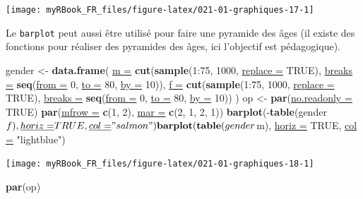 \documentclass[twoside,symmetric]{book}
\newenvironment{Shaded}{}{}
\newcommand{\DataTypeTok}[1]{\underline{#1}}
\newcommand{\DecValTok}[1]{#1}
\newcommand{\KeywordTok}[1]{\textbf{#1}}
\newcommand{\NormalTok}[1]{#1}
\newcommand{\OperatorTok}[1]{#1}
\newcommand{\OtherTok}[1]{#1}
\newcommand{\StringTok}[1]{#1}
\begin{document}
\texttt{[image: myRBook\_FR\_files/figure-latex/021-01-graphiques-17-1]}

Le \texttt{barplot} peut aussi être utilisé pour faire une pyramide des âges (il existe des fonctions pour réaliser des pyramides des âges, ici l'objectif est pédagogique).

\begin{Shaded}
\begin{Highlighting}[]
\NormalTok{gender <-}\StringTok{ }\KeywordTok{data.frame}\NormalTok{(}
  \DataTypeTok{m =} \KeywordTok{cut}\NormalTok{(}\KeywordTok{sample}\NormalTok{(}\DecValTok{1}\OperatorTok{:}\DecValTok{75}\NormalTok{, }\DecValTok{1000}\NormalTok{, }\DataTypeTok{replace =} \OtherTok{TRUE}\NormalTok{), }
    \DataTypeTok{breaks =} \KeywordTok{seq}\NormalTok{(}\DataTypeTok{from =} \DecValTok{0}\NormalTok{, }\DataTypeTok{to =} \DecValTok{80}\NormalTok{, }\DataTypeTok{by =} \DecValTok{10}\NormalTok{)), }
  \DataTypeTok{f =} \KeywordTok{cut}\NormalTok{(}\KeywordTok{sample}\NormalTok{(}\DecValTok{1}\OperatorTok{:}\DecValTok{75}\NormalTok{, }\DecValTok{1000}\NormalTok{, }\DataTypeTok{replace =} \OtherTok{TRUE}\NormalTok{), }
    \DataTypeTok{breaks =} \KeywordTok{seq}\NormalTok{(}\DataTypeTok{from =} \DecValTok{0}\NormalTok{, }\DataTypeTok{to =} \DecValTok{80}\NormalTok{, }\DataTypeTok{by =} \DecValTok{10}\NormalTok{))}
\NormalTok{)}
\NormalTok{op <-}\StringTok{ }\KeywordTok{par}\NormalTok{(}\DataTypeTok{no.readonly =} \OtherTok{TRUE}\NormalTok{)}
\KeywordTok{par}\NormalTok{(}\DataTypeTok{mfrow =} \KeywordTok{c}\NormalTok{(}\DecValTok{1}\NormalTok{, }\DecValTok{2}\NormalTok{), }\DataTypeTok{mar =} \KeywordTok{c}\NormalTok{(}\DecValTok{2}\NormalTok{, }\DecValTok{1}\NormalTok{, }\DecValTok{2}\NormalTok{, }\DecValTok{1}\NormalTok{))}
\KeywordTok{barplot}\NormalTok{(}\OperatorTok{-}\KeywordTok{table}\NormalTok{(gender}\OperatorTok{$}\NormalTok{f), }\DataTypeTok{horiz =} \OtherTok{TRUE}\NormalTok{, }\DataTypeTok{col =} \StringTok{"salmon"}\NormalTok{)}
\KeywordTok{barplot}\NormalTok{(}\KeywordTok{table}\NormalTok{(gender}\OperatorTok{$}\NormalTok{m), }\DataTypeTok{horiz =} \OtherTok{TRUE}\NormalTok{, }\DataTypeTok{col =} \StringTok{"lightblue"}\NormalTok{)}
\end{Highlighting}
\end{Shaded}

\texttt{[image: myRBook\_FR\_files/figure-latex/021-01-graphiques-18-1]}

\begin{Shaded}
\begin{Highlighting}[]
\KeywordTok{par}\NormalTok{(op)}
\end{Highlighting}
\end{Shaded}
\end{document}
